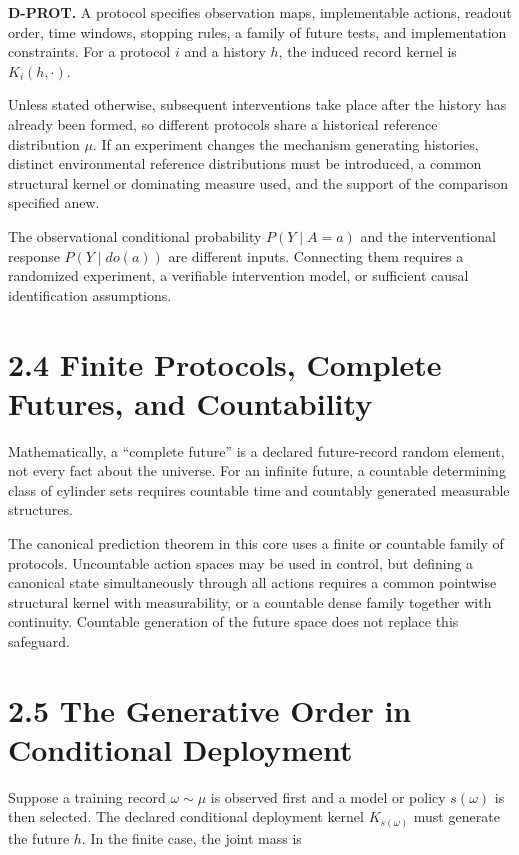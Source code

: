 \documentclass[
  english,
  11pt,
  oneside]{book}
\begin{document}
\textbf{D-PROT.} A protocol specifies observation maps, implementable actions, readout order, time windows, stopping rules, a family of future tests, and implementation constraints. For a protocol \(i\) and a history \(h\), the induced record kernel is \(K_i(h,\cdot)\).

Unless stated otherwise, subsequent interventions take place after the history has already been formed, so different protocols share a historical reference distribution \(\mu\). If an experiment changes the mechanism generating histories, distinct environmental reference distributions must be introduced, a common structural kernel or dominating measure used, and the support of the comparison specified anew.

The observational conditional probability \(P(Y\mid A=a)\) and the interventional response \(P(Y\mid do(a))\) are different inputs. Connecting them requires a randomized experiment, a verifiable intervention model, or sufficient causal identification assumptions.

\section{2.4 Finite Protocols, Complete Futures, and Countability}\label{finite-protocols-complete-futures-and-countability}

Mathematically, a ``complete future'' is a declared future-record random element, not every fact about the universe. For an infinite future, a countable determining class of cylinder sets requires countable time and countably generated measurable structures.

The canonical prediction theorem in this core uses a finite or countable family of protocols. Uncountable action spaces may be used in control, but defining a canonical state simultaneously through all actions requires a common pointwise structural kernel with measurability, or a countable dense family together with continuity. Countable generation of the future space does not replace this safeguard.

\section{2.5 The Generative Order in Conditional Deployment}\label{the-generative-order-in-conditional-deployment}

Suppose a training record \(\omega\sim\mu\) is observed first and a model or policy \(s(\omega)\) is then selected. The declared conditional deployment kernel \(K_{s(\omega)}\) must generate the future \(h\). In the finite case, the joint mass is
\end{document}

